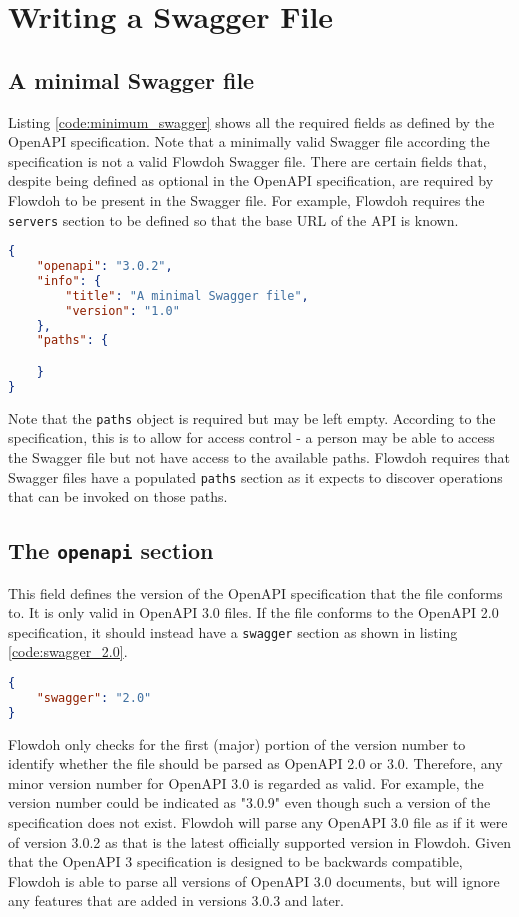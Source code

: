 \section{Writing a Swagger File}
\subsection{A minimal Swagger file}
Listing \ref{code:minimum_swagger} shows all the required fields as defined by the OpenAPI specification. Note that a minimally valid Swagger file according the specification is not a valid Flowdoh Swagger file. There are certain fields that, despite being defined as optional in the OpenAPI specification, are required by Flowdoh to be present in the Swagger file. For example, Flowdoh requires the \texttt{servers} section to be defined so that the base URL of the API is known.
\begin{lstlisting}[caption={A minimal OpenAPI 3.0 definition},label={code:minimum_swagger},language=json]
{
    "openapi": "3.0.2",
    "info": {
        "title": "A minimal Swagger file",
        "version": "1.0"
    },
    "paths": {

    }
}
\end{lstlisting}
Note that the \texttt{paths} object is required but may be left empty. According to the specification, this is to allow for access control \cite{empty_paths} - a person may be able to access the Swagger file but not have access to the available paths. Flowdoh requires that Swagger files have a populated \texttt{paths} section as it expects to discover operations that can be invoked on those paths.
\subsection{The \texttt{openapi} section}
This field defines the version of the OpenAPI specification that the file conforms to. It is only valid in OpenAPI 3.0 files. If the file conforms to the OpenAPI 2.0 specification, it should instead have a \texttt{swagger} section as shown in listing \ref{code:swagger_2.0}.
\begin{lstlisting}[caption={Alternative to the \texttt{openapi} section in OpenAPI 2.0},label={code:swagger_2.0},language=json]
{
    "swagger": "2.0"
}
\end{lstlisting}
Flowdoh only checks for the first (major) portion of the version number to identify whether the file should be parsed as OpenAPI 2.0 or 3.0. Therefore, any minor version number for OpenAPI 3.0 is regarded as valid. For example, the version number could be indicated as "3.0.9" even though such a version of the specification does not exist. Flowdoh will parse any OpenAPI 3.0 file as if it were of version 3.0.2 as that is the latest officially supported version in Flowdoh. Given that the OpenAPI 3 specification is designed to be backwards compatible, Flowdoh is able to parse all versions of OpenAPI 3.0 documents, but will ignore any features that are added in versions 3.0.3 and later.
